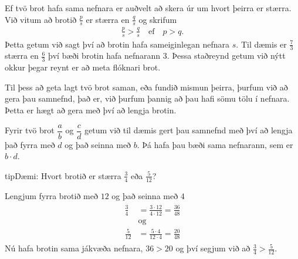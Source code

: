 \documentclass[a4paper,10pt,icelandic]{sphinxmanual}
\begin{document}
Ef tvö brot hafa sama nefnara er auðvelt að skera úr um hvort þeirra er stærra.
Við vitum að brotið \(\frac{p}{s}\) er stærra en \(\frac{q}{s}\) og skrifum
\begin{equation*}
\begin{split}\frac{p}{s}>\frac{q}{s} \quad \text{ef} \quad p>q.\end{split}
\end{equation*}
Þetta getum við sagt því að brotin hafa sameiginlegan nefnara \(s\). Til dæmis er \(\frac{7}{3}\) stærra en \(\frac{6}{3}\) því bæði brotin hafa nefnarann \(3\).
Þessa staðreynd getum við nýtt okkur þegar reynt er að meta flóknari brot.

Til þess að geta lagt tvö brot saman, eða fundið mismun þeirra, þurfum við að gera þau samnefnd, það er, við þurfum  þannig að þau hafi sömu tölu í nefnara. Þetta er hægt að gera með því að lengja brotin.

Fyrir tvö brot \(\dfrac{a}{b}\) og \(\dfrac{c}{d}\) getum við til dæmis gert þau samnefnd með því að lengja það fyrra með \(d\) og það seinna með \(b\). Þá hafa þau bæði sama nefnarann, sem er \(b \cdot d\).

\begin{sphinxadmonition}{tip}{Dæmi:}
Hvort brotið er stærra \(\frac{3}{4}\) eða \(\frac{5}{12}\)?

Lengjum fyrra brotið með \(12\) og það seinna með \(4\)
\begin{equation*}
\begin{split}\begin{aligned}
        \frac{3}{4} &= \frac{3\cdot 12}{4\cdot 12}=\frac{36}{48} \\
        &\text{og} \\
        \frac{5}{12} &= \frac{5\cdot 4}{12\cdot 4}=\frac{20}{48}
\end{aligned}\end{split}
\end{equation*}
Nú hafa brotin sama jákvæða nefnara, \(36>20\) og því segjum við að \(\frac{3}{4}>\frac{5}{12}\).
\end{sphinxadmonition}
\end{document}
